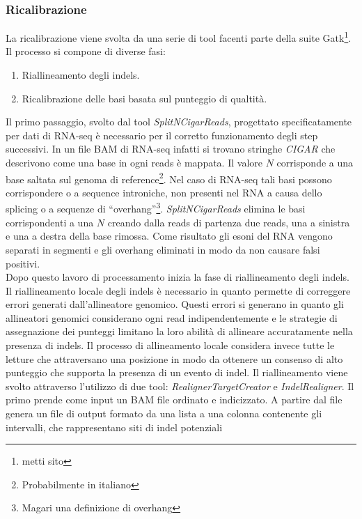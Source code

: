     \subsubsection{Ricalibrazione}
    La ricalibrazione viene svolta da una serie di tool facenti parte della suite Gatk\footnote{metti sito}.
    Il processo si compone di diverse fasi:
    \begin{multicols}{2}
      \begin{enumerate}
        \item Riallineamento degli indels.
        \item Ricalibrazione delle basi basata sul punteggio di qualtit\`a.
      \end{enumerate}
    \end{multicols}
    Il primo passaggio, svolto dal tool \emph{SplitNCigarReads}, progettato specificatamente per dati di RNA-seq \`e necessario per il corretto funzionamento degli step successivi.
    In un file BAM di RNA-seq infatti si trovano stringhe \emph{CIGAR} che descrivono come una base in ogni reads \`e mappata.
    Il valore $N$ corrisponde a una base saltata sul genoma di reference\footnote{Probabilmente in italiano}.
    Nel caso di RNA-seq tali basi possono corrispondere o a sequence introniche, non presenti nel RNA a causa dello splicing o a sequenze di ``overhang''\footnote{Magari una definizione di overhang}.
    \emph{SplitNCigarReads} elimina le basi corrispondenti a una $N$ creando dalla reads di partenza due reads, una a sinistra e una a destra della base rimossa.
    Come risultato gli esoni del RNA vengono separati in segmenti e gli overhang eliminati in modo da non causare falsi positivi.\\
    Dopo questo lavoro di processamento inizia la fase di riallineamento degli indels.
    Il riallineamento locale degli indels \`e necessario in quanto permette di correggere errori generati dall'allineatore genomico.
    Questi errori si generano in quanto gli allineatori genomici considerano ogni read indipendentemente e le strategie di assegnazione dei punteggi limitano la loro abilit\`a di allineare accuratamente nella presenza di indels.
    Il processo di allineamento locale considera invece tutte le letture che attraversano una posizione in modo da ottenere un consenso di alto punteggio che supporta la presenza di un evento di indel.
    Il riallineamento viene svolto attraverso l'utilizzo di due tool: \emph{RealignerTargetCreator} e \emph{IndelRealigner}.
    Il primo prende come input un BAM file ordinato e indicizzato.
    A partire dal file genera un file di output formato da una lista a una colonna contenente gli intervalli, che rappresentano siti di indel potenziali
